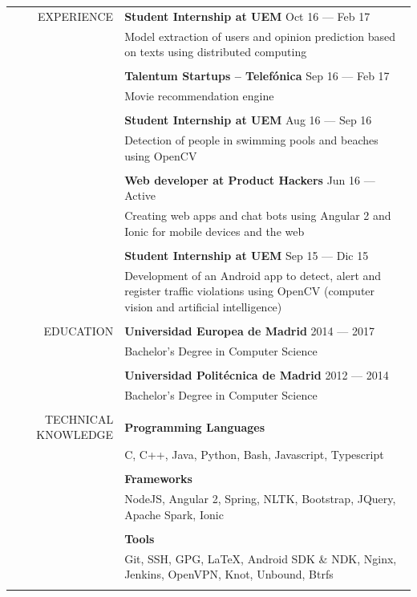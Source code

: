 \documentclass[a4paper, 11pt]{article}
\begin{document}
    \begin{longtable}{rp{11cm}}
        EXPERIENCE
        & {\bf Student Internship at UEM} \hfill Oct 16 --- Feb 17\\
        & Model extraction of users and opinion prediction based on texts using distributed computing\\\\
        & {\bf Talentum Startups -- Telefónica} \hfill Sep 16 --- Feb 17\\
        & Movie recommendation engine\\\\
        & {\bf Student Internship at UEM} \hfill Aug 16 --- Sep 16\\
        & Detection of people in swimming pools and beaches using OpenCV\\\\
        & {\bf Web developer at Product Hackers} \hfill Jun 16 --- Active\\
        & Creating web apps and chat bots using Angular 2 and Ionic for mobile devices and the web\\\\
        & {\bf Student Internship at UEM} \hfill Sep 15 --- Dic 15\\
        &  Development of an Android app to detect, alert and register traffic violations using OpenCV (computer vision and artificial intelligence)\\
        \\
        EDUCATION
        & {\bf Universidad Europea de Madrid} \hfill 2014 --- 2017\\
        & Bachelor's Degree in Computer Science\\\\
        & {\bf Universidad Politécnica de Madrid} \hfill 2012 --- 2014\\
        & Bachelor's Degree in Computer Science\\\\
        TECHNICAL KNOWLEDGE
        & {\bf Programming Languages}\\
        & C, C++, Java, Python, Bash, Javascript, Typescript\\\\
        & {\bf Frameworks}\\
        & NodeJS, Angular 2, Spring, NLTK, Bootstrap, JQuery, Apache Spark, Ionic\\\\
        & {\bf Tools}\\
        & Git, SSH, GPG, \LaTeX, Android SDK \& NDK, Nginx, Jenkins, OpenVPN, Knot, Unbound, Btrfs\\\\

\end{longtable}
\end{document}
